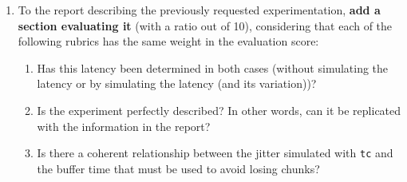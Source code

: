 \begin{enumerate}
\item To the report describing the previously requested
  experimentation, \textbf{add a section evaluating it} (with a ratio out of
  10), considering that each of the following rubrics has the same
  weight in the evaluation score:
  \begin{enumerate}
  \item Has this latency been determined in both cases (without
    simulating the latency or by simulating the latency (and its
    variation))?
  \item Is the experiment perfectly described? In other words, can it be
    replicated with the information in the report?
  \item Is there a coherent relationship between the jitter simulated
    with \texttt{tc} and the buffer time that must be used to avoid
    losing chunks?
  \end{enumerate}
  
\end{enumerate}


